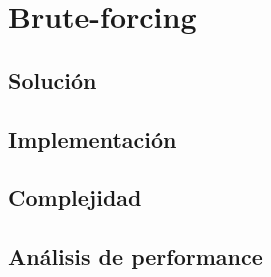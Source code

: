 \section{Brute-forcing}
\subsection{Solución}
\subsection{Implementación}
\subsection{Complejidad}
\subsection{Análisis de performance}